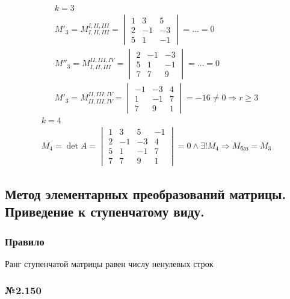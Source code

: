 \documentclass{article}
\begin{document}
\begin{gather*}
	k = 3 \\
	M'_3 = M_{I, II, III}^{I, II, III} = \begin{vmatrix}
		1 & 3 & 5 \\
		2 & -1 & -3 \\
		5 & 1 & -1
	\end{vmatrix} = \dots = 0 \\
	M''_3 = M_{I, II, III}^{II, III, IV} = \begin{vmatrix}
		2 & -1 & -3 \\
		5 & 1 & -1 \\
		7 & 7 & 9
	\end{vmatrix} = \dots = 0 \\
	M'_3 = M_{II, III, IV}^{II, III, IV} = \begin{vmatrix}
		-1 & -3 & 4 \\
		1 & -1 & 7 \\
		7 & 9 & 1
	\end{vmatrix} = -16 \ne 0 \Rightarrow r \ge 3
\end{gather*}
\begin{gather*}
	k = 4 \\
	M_4 = \det A = \begin{vmatrix}
		1 & 3 & 5 & -1 \\
		2 & -1 & -3 & 4 \\
		5 & 1 & -1 & 7 \\
		7 & 7 & 9 & 1
	\end{vmatrix} = 0 \land \exists ! M_4 \Rightarrow M_\text{баз} = M_3
\end{gather*}

\subsection{Метод элементарных преобразований матрицы. \\
Приведение к ступенчатому виду.}

\subsubsection{Правило}

Ранг ступенчатой матрицы равен числу ненулевых строк

\subsubsection*{№2.150}
\end{document}
